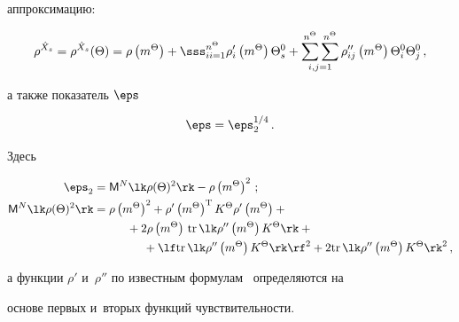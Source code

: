 аппроксимацию:

\begin{equation*}

\rho^{\hat X_s}=\rho^{\hat X_s}(\Theta) =\rho \left(m^\Theta\right) +

\sss_{ii=1}^{n^\Theta} \rho_i' \left(m^\Theta\right)\Theta_s^0+ 

\ss2\limits_{i,j=1} \rho_{ij}'' \left(m^\Theta\right)\Theta_i^0 \Theta_j^0\,,


\end{equation*}

а также показатель $\eps$

\begin{equation*}

\eps =\eps_2^{1/4}\,. %

\end{equation*}

Здесь

\begin{align*}

\eps_2 &= {\sf M}^N \lk \rho (\Theta)^2\rk -\rho \left(m^\Theta\right)^2\,;%

\\

{\sf M}^N \lk \rho(\Theta)^2\rk &= \rho \left(m^\Theta\right)^2 +\rho' \left(m^\Theta\right)^{\mathrm{T}} K^\Theta 

\rho'\left(m^\Theta\right)+{}\\

&\hspace*{10mm}{}+ 2\rho \left(m^\Theta\right)\,\mathrm{tr}\, \lk 

\rho''\left(m^\Theta\right)K^\Theta\rk+{}\\

&\hspace*{15mm}{}+\lf \mathrm{tr}\, \lk \rho'' \left(m^\Theta\right) K^\Theta\rk \rf^2+

2\mathrm{tr}\, \lk \rho''\left(m^\Theta\right) K^\Theta\rk^2\,, %

\end{align*}

а функции $\rho'$ и~$\rho''$ по известным формулам~\cite{11-s1, 12-s1} определяются на 

основе первых и~вторых функций чувствительности.



\pagebreak



